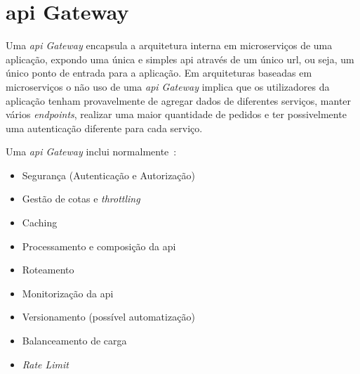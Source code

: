 \section{\acrshort{api} Gateway}\label{sec:api_gateway}

Uma \textit{\acrshort{api} Gateway} encapsula a arquitetura interna em microserviços de uma aplicação, expondo uma única e simples \acrshort{api} através de um único \acrshort{url}, ou seja, um único ponto de entrada para a aplicação. Em arquiteturas baseadas em microserviços o não uso de uma \textit{\acrshort{api} Gateway} implica que os utilizadores da aplicação tenham provavelmente de agregar dados de diferentes serviços, manter vários \textit{endpoints}, realizar uma maior quantidade de pedidos e ter possivelmente uma autenticação diferente para cada serviço.

Uma \textit{\acrshort{api} Gateway} inclui normalmente~\cite{apiGatInfo,apiGatInfo2}:
\begin{itemize}
    \item Segurança (Autenticação e Autorização)
    \item Gestão de cotas e \textit{throttling}
    \item Caching
    \item Processamento e composição da \acrshort{api}
    \item Roteamento
    \item Monitorização da \acrshort{api}
    \item Versionamento (possível automatização)
    \item Balanceamento de carga
    \item \textit{Rate Limit}
\end{itemize}


